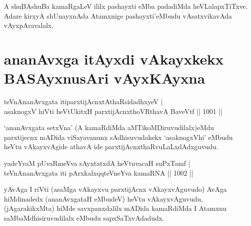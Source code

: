 \begin{artha}
A shuBAshuBa kamaRgaLeV ililx pashayxti eMba padadiMda heVLalapxTiTxve. Adare kirxyA shUnayxnAda Atamxnige pashayxti'eMbudu vAsatxvikavAda vAyxpAravalalx.
\end{artha}

\section*{ananAvxga itAyxdi vAkayxkekx BASAyxnusAri vAyxKAyxna}


\begin{shl}
\footnotemark[1]teVnAnanAvxgata itiparxtijAcnxtAthaRsidadhxyeV | \\
asaknogxV hiVti heVtUkitxH parxtijAcnxthoVR\s thavA BaveVtf \hfill||  1001 || 
\end{shl}

\begin{artha}
`ananAvxgata setxVna' (A kamaRdiMda aMTikoMDiruvudilalx)eMdu parxtijecnx mADida viSayavanunx sAdhisuvudakekx `asaknogxVhi'  eMbudu heVtu vAkayxvAgide athavA ide parxtijAcnxthaRvuLaLxdAdxguvudu.
\end{artha}


\begin{shl}
\footnotemark[2]yadeYvaM pUvaRmeVva sAyxtatxdA heVtuvacaH suPxTamf | \\
teVnAnanAvxgata iti pArxkalxqqteVneYva kamaRNA \hfill||  1002 ||  
\end{shl}

\begin{artha}
yAvAga I riVti (asaMga vAkayxvu parxtijAcnx vAkayxvAguvudo) AvAga hiMdinadedx (ananAvxgataH eMbudeV) heVtu vAkayxvAguvudu, (jAgarakikxMta) hiMde savxpanxdalilx mADida kamaRdiMda I Atamxnu saMbaMdhisiruvudilalx eMbudu sapxSaTxvAdadudx.
\end{artha}

